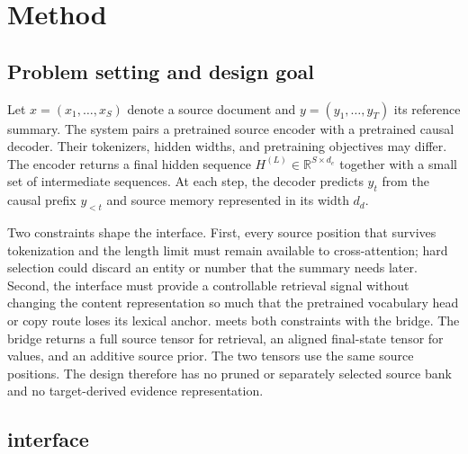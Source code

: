 
\section{Method}
\label{sec:method}

\subsection{Problem setting and design goal}
\label{sec:setting}

Let $x=(x_1,\ldots,x_S)$ denote a source document and
$y=(y_1,\ldots,y_T)$ its reference summary.  The system pairs a pretrained
source encoder with a pretrained causal decoder.  Their tokenizers, hidden
widths, and pretraining objectives may differ.  The encoder returns a final
hidden sequence $H^{(L)}\in\mathbb{R}^{S\times d_e}$ together with a small set
of intermediate sequences.  At each step, the decoder predicts $y_t$ from the
causal prefix $y_{<t}$ and source memory represented in its width $d_d$.

Two constraints shape the interface.  First, every source position that survives
tokenization and the length limit must remain available to cross-attention;
hard selection could discard an entity or number that the summary needs later.
Second, the interface must provide a controllable retrieval signal without
changing the content representation so much that the pretrained vocabulary
head or copy route loses its lexical anchor.  \EviSeq meets both constraints
with the \AFMR{} bridge.  The bridge returns a full source tensor for retrieval,
an aligned final-state tensor for values, and an additive source prior.  The two
tensors use the same source positions.  The design therefore has no pruned or
separately selected source bank and no target-derived evidence representation.

\subsection{\AFMR interface}
\label{sec:afmr-method}

